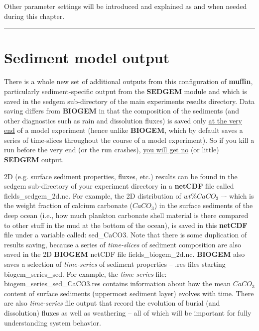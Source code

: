 \vspace{1mm}
\noindent Other parameter settings will be introduced and explained as and when needed during this chapter.

\vspace{1mm}
\noindent\rule{4cm}{0.1mm}
\vspace{2mm}

\newpage

\section{Sediment model output}

There is a whole new set of additional outputs from this configuration of \textbf{muffin}, particularly sediment-specific output from the \textbf{SEDGEM} module and which is saved in the \textsf{\footnotesize sedgem} sub-directory of the main experiments results directory. Data saving differs from \textbf{BIOGEM} in that the composition of the sediments (and other diagnostics such as rain and dissolution fluxes) is saved only \uline{at the very end} of a model experiment (hence unlike \textbf{BIOGEM}, which by default saves a series of time-slices throughout the course of a model experiment). So if you kill a run before the very end (or the run crashes),  \uline{you will get no} (or little) \textbf{SEDGEM} output.

2D (e.g. surface sediment properties, fluxes, etc.) results can be found in  the \textsf{\footnotesize sedgem} sub-directory of your experiment directory  in a \textbf{netCDF} file called \textsf{\footnotesize fields\_sedgem\_2d.nc}. For example, the 2D distribution of \(wt\% CaCO_{3}\) –- which is the weight fraction of calcium carbonate (\(CaCO_{3}\)) in the surface sediments of the deep ocean (i.e., how much plankton carbonate shell material is there compared to other stuff in the mud at the bottom of the ocean), is saved in this \textbf{netCDF} file under a variable called: \textsf{\footnotesize sed\_CaCO3}. Note that there is some duplication of results saving, because a series of \textit{time-slices} of sediment composition are also saved in the 2D \textbf{BIOGEM} netCDF file \textsf{\footnotesize fields\_biogem\_2d.nc}. \textbf{BIOGEM} also saves a selection of \textit{time-series }of sediment properties -- \textsf{\footnotesize .res} files starting \textsf{\footnotesize biogem\_series\_sed}. For example, the \textit{time-series} file: \textsf{\footnotesize biogem\_series\_sed\_CaCO3.res} contains information about how the mean \(CaCO_{3}\) content of surface sediments (uppermost sediment layer) evolves with time. There are also \textit{time-series} file output that record the evolution of burial (and dissolution) fluxes as well as weathering -- all of which will be important for fully understanding system behavior.

